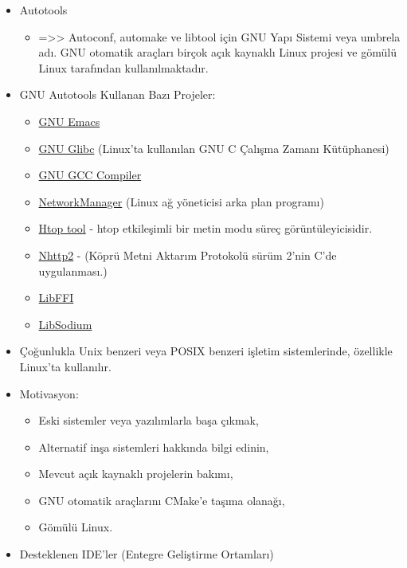 \documentclass[
]{book}
\providecommand{\tightlist}{%
  \setlength{\itemsep}{0pt}\setlength{\parskip}{0pt}}
\begin{document}
\begin{itemize}
\item
  Autotools

  \begin{itemize}
  \tightlist
  \item
    =\textgreater\textgreater{} Autoconf, automake ve libtool için GNU Yapı Sistemi veya umbrela adı. GNU otomatik araçları birçok açık kaynaklı Linux projesi ve gömülü Linux tarafından kullanılmaktadır.
  \end{itemize}
\item
  GNU Autotools Kullanan Bazı Projeler:

  \begin{itemize}
  \tightlist
  \item
    \href{https://github.com/emacs-mirror/emacs}{GNU Emacs}
  \item
    \href{https://github.com/bminor/glibc}{GNU Glibc} (Linux'ta kullanılan GNU C Çalışma Zamanı Kütüphanesi)
  \item
    \href{https://github.com/gcc-mirror/gcc/blob/master/configure.ac}{GNU GCC Compiler}
  \item
    \href{https://gitlab.freedesktop.org/NetworkManager/NetworkManager/blob/master/configure.ac}{NetworkManager} (Linux ağ yöneticisi arka plan programı)
  \item
    \href{https://github.com/hishamhm/htop/blob/master/configure.ac}{Htop tool} - htop etkileşimli bir metin modu süreç görüntüleyicisidir.
  \item
    \href{https://github.com/nghttp2/nghttp2/blob/master/configure.ac}{Nhttp2} - (Köprü Metni Aktarım Protokolü sürüm 2'nin C'de uygulanması.)
  \item
    \href{https://github.com/mingw-deb/libffi/blob/master/configure}{LibFFI}
  \item
    \href{https://github.com/wireapp/libsodium/blob/master/configure.ac}{LibSodium}
  \end{itemize}
\item
  Çoğunlukla Unix benzeri veya POSIX benzeri işletim sistemlerinde, özellikle Linux'ta kullanılır.
\item
  Motivasyon:

  \begin{itemize}
  \tightlist
  \item
    Eski sistemler veya yazılımlarla başa çıkmak,
  \item
    Alternatif inşa sistemleri hakkında bilgi edinin,
  \item
    Mevcut açık kaynaklı projelerin bakımı,
  \item
    GNU otomatik araçlarını CMake'e taşıma olanağı,
  \item
    Gömülü Linux.
  \end{itemize}
\item
  Desteklenen IDE'ler (Entegre Geliştirme Ortamları)


\end{itemize}
\end{document}

